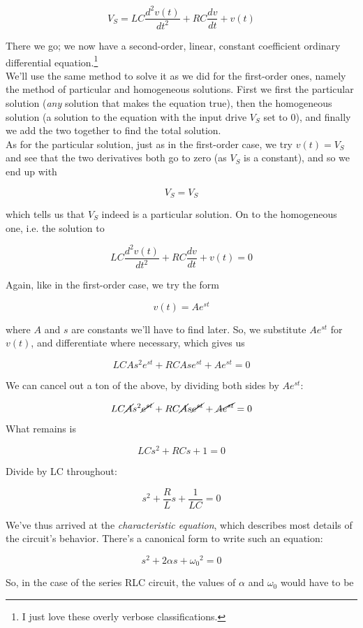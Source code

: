 \documentclass[12pt,a4paper]{report}
\begin{document}
\[ V_S = LC \frac{d^2v(t)}{dt^2} + RC \frac{dv}{dt} + v(t) \]

There we go; we now have a second-order, linear, constant coefficient ordinary differential equation.\footnote{I just love these overly verbose classifications.}\\

We'll use the same method to solve it as we did for the first-order ones, namely the method of particular and homogeneous solutions. First we first the particular solution (\emph{any} solution that makes the equation true), then the homogeneous solution (a solution to the equation with the input drive $V_S$ set to 0), and finally we add the two together to find the total solution.\\

As for the particular solution, just as in the first-order case, we try $v(t) = V_S$ and see that the two derivatives both go to zero (as $V_S$ is a constant), and so we end up with

\[ V_S = V_S \]

which tells us that $V_S$ indeed is a particular solution. On to the homogeneous one, i.e. the solution to 

\[ LC \frac{d^2v(t)}{dt^2} + RC \frac{dv}{dt} + v(t) = 0\]

Again, like in the first-order case, we try the form 

\[ v(t) = Ae^{st} \]

where $A$ and $s$ are constants we'll have to find later. So, we substitute $Ae^{st}$ for $v(t)$, and differentiate where necessary, which gives us

\[ LC As^2 e^{st} + RC As e^{st} + A e^{st} = 0 \]

We can cancel out a ton of the above, by dividing both sides by $A e^{st}$:

\[ LC \cancel{A} s^2 \cancel{e^{st}} + RC \cancel{A}s \cancel{e^{st}} + \cancel{A e^{st}} = 0 \]
What remains is

\[ LC s^2 + RC s + 1 = 0 \]

Divide by LC throughout:

\[ s^2 + \frac{R}{L} s + \frac{1}{LC} = 0 \]

We've thus arrived at the \emph{characteristic equation}, which describes most details of the circuit's behavior. There's a canonical form to write such an equation:

\[ s^2 + 2\alpha s + {\omega_0}^2 = 0 \]

So, in the case of the series RLC circuit, the values of $\alpha$ and $\omega_0$ would have to be
\end{document}
